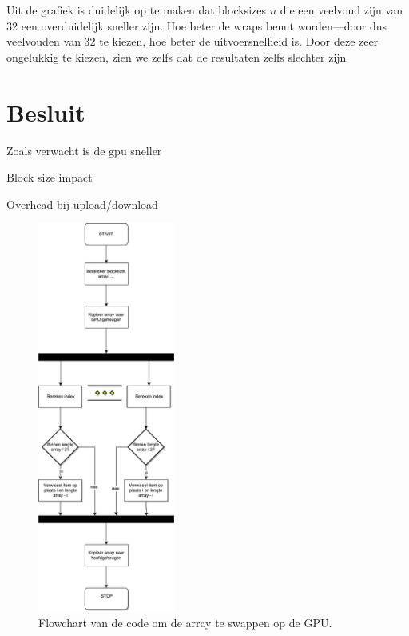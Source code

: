 \documentclass[10pt, twocolumn, a4paper]{article}
\begin{document}
Uit de grafiek is duidelijk op te maken dat blocksizes $n$ die een veelvoud zijn van 32 een overduidelijk sneller zijn. Hoe beter de wraps benut worden---door dus veelvouden van 32 te kiezen, hoe beter de uitvoersnelheid is. Door deze zeer ongelukkig te kiezen, zien we zelfs dat de resultaten zelfs slechter zijn 



\section{Besluit}
Zoals verwacht is de gpu sneller

Block size impact

Overhead bij upload/download


\onecolumn

\appendix

\begin{figure}[H]
  \centering
  \includegraphics[width=0.4\textwidth]{flowgraph.pdf}
  \caption{Flowchart van de code om de array te swappen op de GPU.}
\end{figure}

\newpage



\newpage

\inputminted[tabsize=4,obeytabs, ]{c}{main.c}

\end{document}
